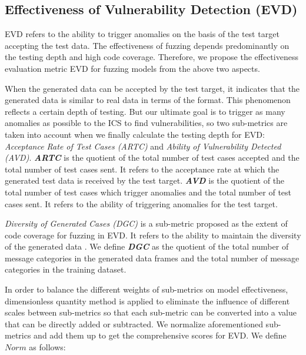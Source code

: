 \subsection{\textbf{Effectiveness of Vulnerability Detection (EVD)}}
EVD refers to the ability to trigger anomalies on the basis of the test target accepting the test data. The effectiveness of fuzzing depends predominantly on the testing depth and high code coverage. Therefore, we propose the effectiveness evaluation metric EVD for fuzzing models from the above two aspects.

When the generated data can be accepted by the test target, it indicates that the generated data is similar to real data in terms of the format. This phenomenon reflects a certain depth of testing. But our ultimate goal is to trigger as many anomalies as possible to the ICS to find vulnerabilities, so two sub-metrics are taken into account when we finally calculate the testing depth for EVD: \textit{Acceptance Rate of Test Cases (ARTC)} and \textit{Ability of Vulnerability Detected (AVD)}. \textit{\textbf{ARTC}} is the quotient of the total number of test cases accepted and the total number of test cases sent. It refers to the acceptance rate at which the generated test data is received by the test target. \textit{\textbf{AVD}} is the quotient of the total number of test cases which trigger anomalies and the total number of test cases sent. It refers to the ability of triggering anomalies for the test target. 

\textit{Diversity of Generated Cases (DGC)} is a sub-metric proposed as the extent of code coverage for fuzzing in EVD. It refers to the ability to maintain the diversity of the generated data \cite{mondal2015exploring}. We define \textit{\textbf{DGC}} as the quotient of the total number of message categories in the generated data frames and the total number of message categories in the training dataset.%

In order to balance the different weights of sub-metrics on model effectiveness, dimensionless quantity method is applied to eliminate the influence of different scales between sub-metrics so that each sub-metric can be converted into a value that can be directly added or subtracted. We normalize aforementioned sub-metrics and add them up to get the comprehensive scores for EVD. We define $Norm$ as follows:

